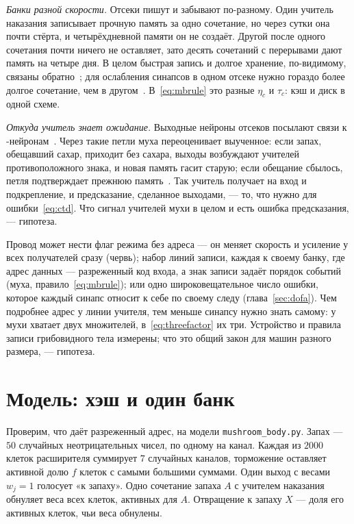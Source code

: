 \emph{Банки разной скорости.} Отсеки пишут и забывают по-разному. Один учитель наказания записывает прочную память за одно сочетание, но через сутки она почти стёрта, и четырёхдневной памяти он не создаёт. Другой после одного сочетания почти ничего не оставляет, зато десять сочетаний с перерывами дают память на четыре дня. В целом быстрая запись и долгое хранение, по-видимому, связаны обратно~\cite{AsoRubin2016}; для ослабления синапсов в одном отсеке нужно гораздо более долгое сочетание, чем в другом~\cite{Hige2015}. В~\eqref{eq:mbrule} это разные $\eta_c$ и $\tau_c$: кэш и диск в одной схеме.

\emph{Откуда учитель знает ожидание.} Выходные нейроны отсеков посылают связи к -нейронам~\cite{Li2020}. Через такие петли муха переоценивает выученное: если запах, обещавший сахар, приходит без сахара, выходы возбуждают учителей противоположного знака, и новая память гасит старую; если обещание сбылось, петля подтверждает прежнюю память~\cite{Felsenberg2017}. Так учитель получает на вход и подкрепление, и предсказание, сделанное выходами, --- то, что нужно для ошибки~\eqref{eq:ctd}. Что сигнал учителей мухи в целом и есть ошибка предсказания, --- гипотеза.

\begin{keyblock}
\begin{proposition}
\label{prop:wormfly}
Провод  может нести флаг режима без адреса --- он меняет скорость и усиление у всех получателей сразу (червь); набор линий записи, каждая к своему банку, где адрес данных --- разреженный код входа, а знак записи задаёт порядок событий (муха, правило~\eqref{eq:mbrule}); или одно широковещательное число ошибки, которое каждый синапс относит к себе по своему следу (глава~\ref{sec:dofa}). Чем подробнее адрес у линии учителя, тем меньше синапсу нужно знать самому: у мухи хватает двух множителей, в~\eqref{eq:threefactor} их три. Устройство и правила записи грибовидного тела измерены; что это общий закон для машин разного размера, --- гипотеза.
\end{proposition}
\end{keyblock}

\section{Модель: хэш и один банк}

Проверим, что даёт разреженный адрес, на модели \texttt{mushroom\_body.py}. Запах --- $50$ случайных неотрицательных чисел, по одному на канал. Каждая из $2000$ клеток расширителя суммирует $7$ случайных каналов, торможение оставляет активной долю $f$ клеток с самыми большими суммами. Один выход с весами $w_j=1$ голосует «к запаху». Одно сочетание запаха $A$ с учителем наказания обнуляет веса всех клеток, активных для $A$. Отвращение к запаху $X$ --- доля его активных клеток, чьи веса обнулены.

